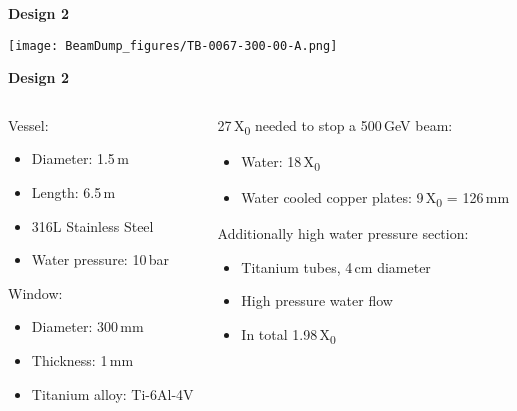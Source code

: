 \documentclass[xcolor={dvipsnames}]{beamer}
\begin{document}
\begin{frame}{\textbf{Design 2}}
\begin{center}
  \texttt{[image: BeamDump\_figures/TB-0067-300-00-A.png]}
 \end{center}
\end{frame}
{
\begin{frame}{\textbf{Design 2}}
\begin{columns}
 \begin{column}{0.5\textwidth}
  Vessel:
  \begin{itemize}
   \item Diameter: 1.5\,m
   \item Length: 6.5\,m
   \item 316L Stainless Steel
   \item Water pressure: 10\,bar
  \end{itemize}
  Window:
  \begin{itemize}
   \item Diameter: 300\,mm
   \item Thickness: 1\,mm
   \item Titanium alloy: Ti-6Al-4V 
  \end{itemize}
 \end{column}
 \begin{column}{0.5\textwidth}
  27\,X\textsubscript{0} needed to stop a 500\,GeV beam:
  \begin{itemize}
   \item Water: 18\,X\textsubscript{0}
   \item Water cooled copper plates: 9\,X\textsubscript{0} = 126\,mm
  \end{itemize}  
    Additionally high water pressure section:
  \begin{itemize}
   \item Titanium tubes, 4\,cm diameter
   \item High pressure water flow
   \item In total 1.98\,X\textsubscript{0}
  \end{itemize} 
 \end{column}
\end{columns}

\end{frame}
}
\end{document}
